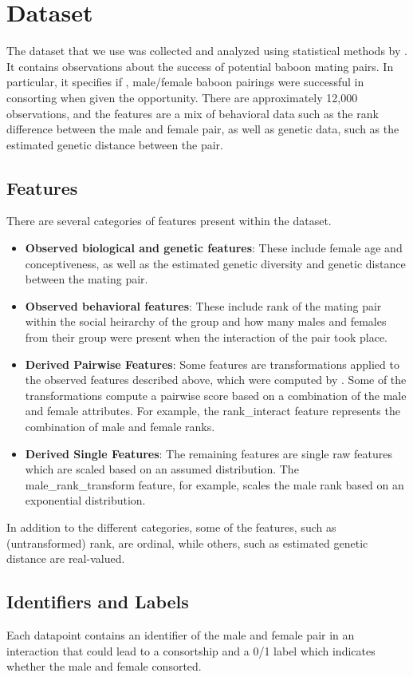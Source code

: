 \documentclass[twoside,twocolumn,paper=letter]{article}
\begin{document}
\section{Dataset}
The dataset that we use was collected and analyzed using statistical methods by
\cite{Tung:2012}. It contains observations about the success of potential baboon
mating pairs. In particular, it specifies if , male/female baboon pairings were
successful in consorting when given the opportunity.  There are approximately
12,000 observations, and the features are a mix of behavioral data such as the
rank difference between the male and female pair, as well as genetic data, such
as the estimated genetic distance between the pair. 
\subsection{Features}
There are several categories of features present within the dataset.
\begin{itemize}
  \item{\textbf{Observed biological and genetic features}: These include female age
    and conceptiveness, as well as the estimated genetic diversity and genetic
    distance between the mating pair.}
  \item{\textbf{Observed behavioral features}: These include rank of the mating pair
    within the social heirarchy of the group and how many males and females from
    their group were present when the interaction of the pair took place.}
  \item{\textbf{Derived Pairwise Features}: Some features are
    transformations applied to the observed features described above, which were
    computed by \cite{Tung:2012}. Some of the transformations compute a pairwise
    score based on a combination of the male and female attributes. For example,
    the rank\_interact feature represents the combination of male and female
    ranks.
    }
  \item{\textbf{Derived Single Features}: The remaining features are single
    raw features which are scaled based on an assumed distribution.  The
    male\_rank\_transform feature, for example, scales the male rank based on an
    exponential distribution.}
\end{itemize}

In addition to the different categories, some of the features, such as
(untransformed) rank, are ordinal, while others, such as estimated genetic
distance are real-valued.

\subsection{Identifiers and Labels}
Each datapoint contains an identifier of the male and female pair in an
interaction that could lead to a consortship and a 0/1 label which indicates
whether the male and female consorted.
\end{document}
